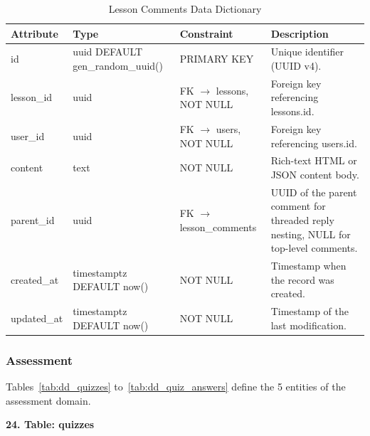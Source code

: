 \documentclass[12pt, oneside]{article} %
\newcommand{\tabbreak}{\hyphenpenalty=200\exhyphenpenalty=200\tolerance=4000\hbadness=10000\hspace{0pt}}
\begin{document}
\begin{table}[H]
\caption{Lesson Comments Data Dictionary}
\label{tab:dd_lesson_comments}
\vspace{-4mm}
\begin{center}
\renewcommand{\arraystretch}{1.15}
\scriptsize
\begin{tabular}{|>{\raggedright\arraybackslash\tabbreak}p{2.67cm}|>{\raggedright\arraybackslash\tabbreak}p{2.93cm}|>{\raggedright\arraybackslash\tabbreak}p{2.67cm}|>{\raggedright\arraybackslash\tabbreak}p{4.51cm}|}
\hline
\textbf{Attribute} & \textbf{Type} & \textbf{Constraint} & \textbf{Description} \\ \hline
id & uuid DEFAULT gen\_random\_uuid() & PRIMARY KEY & Unique identifier (UUID v4). \\ \hline
lesson\_id & uuid & FK $\rightarrow$ lessons, NOT NULL & Foreign key referencing lessons.id. \\ \hline
user\_id & uuid & FK $\rightarrow$ users, NOT NULL & Foreign key referencing users.id. \\ \hline
content & text & NOT NULL & Rich-text HTML or JSON content body. \\ \hline
parent\_id & uuid & FK $\rightarrow$ lesson\_comments & UUID of the parent comment for threaded reply nesting, NULL for top-level comments. \\ \hline
created\_at & timestamptz DEFAULT now() & NOT NULL & Timestamp when the record was created. \\ \hline
updated\_at & timestamptz DEFAULT now() & NOT NULL & Timestamp of the last modification. \\ \hline
\end{tabular}
\end{center}
\end{table}

\subsubsection{Assessment}

Tables~\ref{tab:dd_quizzes} to~\ref{tab:dd_quiz_answers} define the 5 entities of the assessment domain.

\textbf{24. Table: quizzes}
\end{document}
